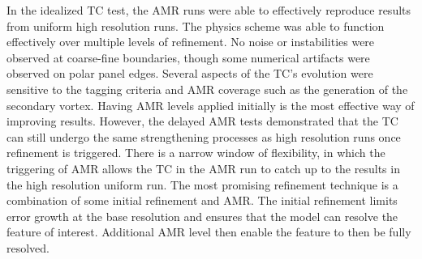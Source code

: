 In the idealized TC test, the AMR runs were able to effectively reproduce results from uniform high resolution runs.
The physics scheme was able to function effectively over multiple levels of refinement. No noise
or instabilities were observed at coarse-fine boundaries, though some
 numerical artifacts were observed on polar panel edges. 
Several aspects of the TC's evolution were
sensitive to the tagging criteria and AMR coverage such as the generation of the secondary vortex.
Having  AMR levels applied initially is the most effective way of improving results.
However, the delayed AMR tests demonstrated that the TC can still 
undergo the same strengthening processes as high resolution runs once refinement is triggered.
There is a narrow window of flexibility, in which the triggering of AMR allows the TC in the AMR 
run to catch up to the results in the high resolution uniform run.
The most promising refinement technique is a combination of some initial 
refinement and AMR. The initial refinement limits error growth at the 
base resolution and ensures that the model can resolve the feature of interest. 
Additional AMR level then enable the feature to then be fully resolved.



